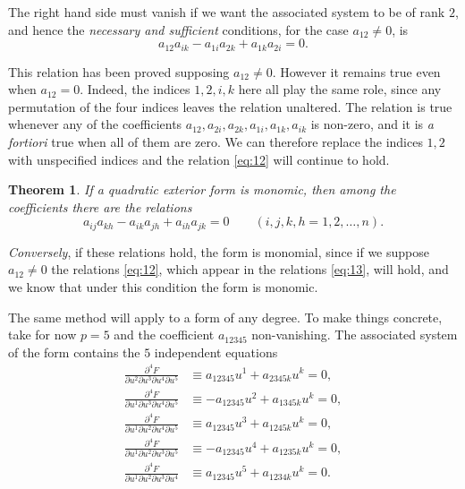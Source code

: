 \documentclass[leqno,11pt]{book}
\numberwithin{equation}{chapter}
\newcommand{\pd}{\partial}
\theoremstyle{shape1}
\newtheorem*{thm*}{\hspace{15pt}Theorem}
\theoremstyle{shape0}
\theoremstyle{shape2}
\theoremstyle{definition}
\begin{document}
The right hand side must vanish if we want the associated system to be of rank $2$, and hence the \emph{necessary and sufficient} conditions, for the case $a_{12}\neq 0$, is
\begin{equation}
  \label{eq:12}
  a_{12}a_{ik}-a_{1i}a_{2k}+a_{1k}a_{2i}=0.
\end{equation}

This relation has been proved supposing $a_{12}\neq 0$. However it remains true even when $a_{12}=0$. Indeed, the indices $1,2,i,k$ here all play the same role, since any permutation of the four indices leaves the relation unaltered. The relation is true whenever any of the coefficients $a_{12},a_{2i},a_{2k},a_{1i},a_{1k},a_{ik}$ is non-zero, and it is \emph{a fortiori} true when all of them are zero. We can therefore replace the indices $1,2$ with unspecified indices and the relation \eqref{eq:12} will continue to hold.

\begin{thm*}
  If a quadratic exterior form is monomic, then  among the coefficients there are the relations
  \begin{equation}
    \label{eq:13}
    a_{ij}a_{kh}-a_{ik}a_{jh}+a_{ih}a_{jk}=0\qquad(i,j,k,h=1,2,\dots,n).
  \end{equation}
\end{thm*}

\emph{Conversely}, if these relations hold, the form is monomial, since if we suppose $a_{12}\neq 0$ the relations \eqref{eq:12}, which appear in the relations \eqref{eq:13}, will hold, and we know that under this condition the form is monomic.

\vspace{12pt}\fsec \label{fsec:10} The same method will apply to a form of any degree. To make things concrete, take for now $p=5$ and the coefficient $a_{12345}$  non-vanishing. The associated system of the form contains the $5$ independent equations
\begin{align*}
  \frac{\pd^{4}F}{\pd u^{2}\pd u^{3}\pd u^{4}\pd u^{5}}&\equiv a_{12345}u^{1}+a_{2345k}u^{k}=0,\\
  \frac{\pd^{4}F}{\pd u^{1}\pd u^{3}\pd u^{4}\pd u^{5}}&\equiv -a_{12345}u^{2}+a_{1345k}u^{k}=0,\\
  \frac{\pd^{4}F}{\pd u^{1}\pd u^{2}\pd u^{4}\pd u^{5}}&\equiv a_{12345}u^{3}+a_{1245k}u^{k}=0,\\
  \frac{\pd^{4}F}{\pd u^{1}\pd u^{2}\pd u^{3}\pd u^{5}}&\equiv -a_{12345}u^{4}+a_{1235k}u^{k}=0,\\
  \frac{\pd^{4}F}{\pd u^{1}\pd u^{2}\pd u^{3}\pd u^{4}}&\equiv a_{12345}u^{5}+a_{1234k}u^{k}=0.
\end{align*}
\end{document}
